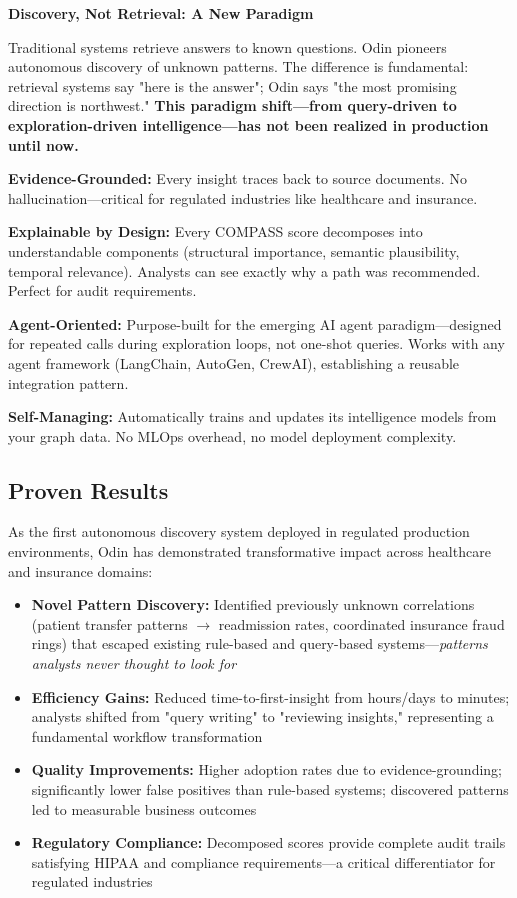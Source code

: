 \documentclass[11pt]{article}
\begin{document}
\begin{highlightbox}
\textbf{Discovery, Not Retrieval: A New Paradigm}

Traditional systems retrieve answers to known questions. Odin pioneers autonomous discovery of unknown patterns. The difference is fundamental: retrieval systems say "here is the answer"; Odin says "the most promising direction is northwest." \textbf{This paradigm shift—from query-driven to exploration-driven intelligence—has not been realized in production until now.}
\end{highlightbox}

\textbf{Evidence-Grounded:} Every insight traces back to source documents. No hallucination—critical for regulated industries like healthcare and insurance.

\textbf{Explainable by Design:} Every COMPASS score decomposes into understandable components (structural importance, semantic plausibility, temporal relevance). Analysts can see exactly why a path was recommended. Perfect for audit requirements.

\textbf{Agent-Oriented:} Purpose-built for the emerging AI agent paradigm—designed for repeated calls during exploration loops, not one-shot queries. Works with any agent framework (LangChain, AutoGen, CrewAI), establishing a reusable integration pattern.

\textbf{Self-Managing:} Automatically trains and updates its intelligence models from your graph data. No MLOps overhead, no model deployment complexity.

\subsection{Proven Results}

As the first autonomous discovery system deployed in regulated production environments, Odin has demonstrated transformative impact across healthcare and insurance domains:

\begin{itemize}
\item \textbf{Novel Pattern Discovery:} Identified previously unknown correlations (patient transfer patterns $\rightarrow$ readmission rates, coordinated insurance fraud rings) that escaped existing rule-based and query-based systems—\textit{patterns analysts never thought to look for}
\item \textbf{Efficiency Gains:} Reduced time-to-first-insight from hours/days to minutes; analysts shifted from "query writing" to "reviewing insights," representing a fundamental workflow transformation
\item \textbf{Quality Improvements:} Higher adoption rates due to evidence-grounding; significantly lower false positives than rule-based systems; discovered patterns led to measurable business outcomes
\item \textbf{Regulatory Compliance:} Decomposed scores provide complete audit trails satisfying HIPAA and compliance requirements—a critical differentiator for regulated industries
\end{itemize}
\end{document}
